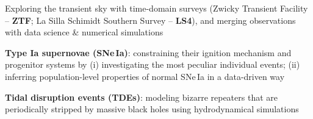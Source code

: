 


\begin{cvpubs}


\cvpub
{ %
\begin{cvitems}
\item Exploring the transient sky with time-domain surveys (Zwicky Transient Facility -- {\bf\color{darktext}ZTF}; La Silla Schimidt Southern Survey -- {\bf\color{darktext}LS4}), and merging observations with data science \& numerical simulations
\item {\bf\color{darktext}Type Ia supernovae (SNe\,Ia)}: constraining their ignition mechanism and progenitor systems by (i) investigating the most peculiar individual events; (ii) inferring population-level properties of normal SNe\,Ia in a data-driven way
\item {\bf\color{darktext}Tidal disruption events (TDEs)}: modeling bizarre repeaters that are periodically stripped by massive black holes using hydrodynamical simulations
\end{cvitems}
}


\end{cvpubs}